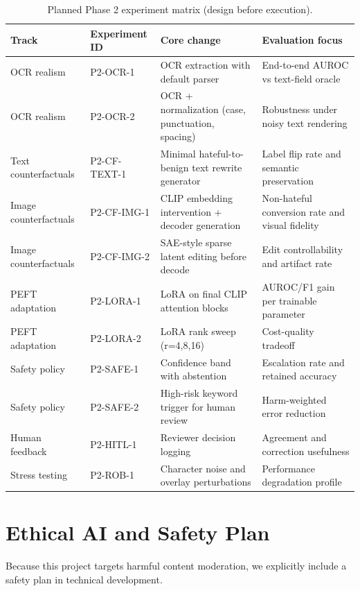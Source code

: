 \documentclass[11pt]{article}
\begin{document}
\begin{table}[t]
\centering
\small
\caption{Planned Phase 2 experiment matrix (design before execution).}
\begin{tabularx}{\textwidth}{l l l X}
\toprule
Track & Experiment ID & Core change & Evaluation focus \\
\midrule
OCR realism & P2-OCR-1 & OCR extraction with default parser & End-to-end AUROC vs text-field oracle \\
OCR realism & P2-OCR-2 & OCR + normalization (case, punctuation, spacing) & Robustness under noisy text rendering \\
Text counterfactuals & P2-CF-TEXT-1 & Minimal hateful-to-benign text rewrite generator & Label flip rate and semantic preservation \\
Image counterfactuals & P2-CF-IMG-1 & CLIP embedding intervention + decoder generation & Non-hateful conversion rate and visual fidelity \\
Image counterfactuals & P2-CF-IMG-2 & SAE-style sparse latent editing before decode & Edit controllability and artifact rate \\
PEFT adaptation & P2-LORA-1 & LoRA on final CLIP attention blocks & AUROC/F1 gain per trainable parameter \\
PEFT adaptation & P2-LORA-2 & LoRA rank sweep (r=4,8,16) & Cost-quality tradeoff \\
Safety policy & P2-SAFE-1 & Confidence band with abstention & Escalation rate and retained accuracy \\
Safety policy & P2-SAFE-2 & High-risk keyword trigger for human review & Harm-weighted error reduction \\
Human feedback & P2-HITL-1 & Reviewer decision logging & Agreement and correction usefulness \\
Stress testing & P2-ROB-1 & Character noise and overlay perturbations & Performance degradation profile \\
\bottomrule
\end{tabularx}
\label{tab:p2matrix}
\end{table}

\section{Ethical AI and Safety Plan}
Because this project targets harmful content moderation, we explicitly include a safety plan in technical development.
\end{document}

